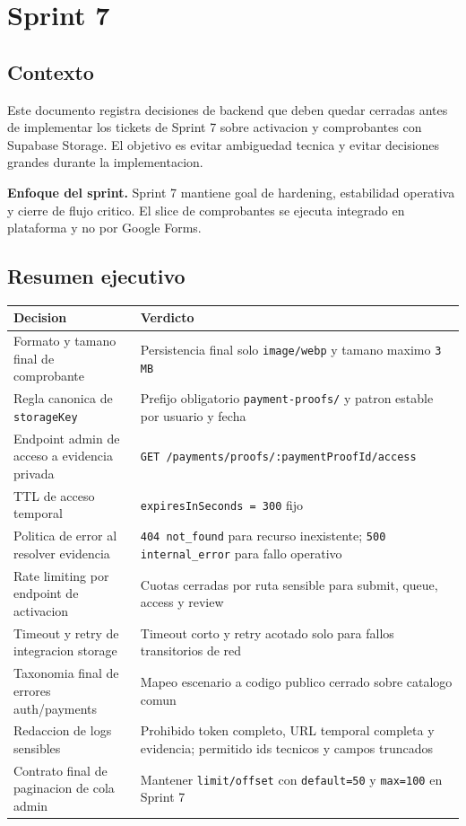 \section{Sprint 7}

\subsection{Contexto}

Este documento registra decisiones de backend que deben quedar cerradas antes de implementar los tickets de Sprint 7 sobre activacion y comprobantes con Supabase Storage. El objetivo es evitar ambiguedad tecnica y evitar decisiones grandes durante la implementacion.

\begin{docnote}
\textbf{Enfoque del sprint.} Sprint 7 mantiene goal de hardening, estabilidad operativa y cierre de flujo critico. El slice de comprobantes se ejecuta integrado en plataforma y no por Google Forms.
\end{docnote}

\subsection{Resumen ejecutivo}

\begin{longtable}{p{}p{}}
\toprule
\textbf{Decision} & \textbf{Verdicto} \\
\midrule
Formato y tamano final de comprobante & Persistencia final solo \texttt{image/webp} y tamano maximo \texttt{3 MB} \\
Regla canonica de \texttt{storageKey} & Prefijo obligatorio \texttt{payment-proofs/} y patron estable por usuario y fecha \\
Endpoint admin de acceso a evidencia privada & \texttt{GET /payments/proofs/:paymentProofId/access} \\
TTL de acceso temporal & \texttt{expiresInSeconds = 300} fijo \\
Politica de error al resolver evidencia & \texttt{404 not\_found} para recurso inexistente; \texttt{500 internal\_error} para fallo operativo \\
Rate limiting por endpoint de activacion & Cuotas cerradas por ruta sensible para submit, queue, access y review \\
Timeout y retry de integracion storage & Timeout corto y retry acotado solo para fallos transitorios de red \\
Taxonomia final de errores auth/payments & Mapeo escenario a codigo publico cerrado sobre catalogo comun \\
Redaccion de logs sensibles & Prohibido token completo, URL temporal completa y evidencia; permitido ids tecnicos y campos truncados \\
Contrato final de paginacion de cola admin & Mantener \texttt{limit/offset} con \texttt{default=50} y \texttt{max=100} en Sprint 7 \\
\bottomrule
\end{longtable}

